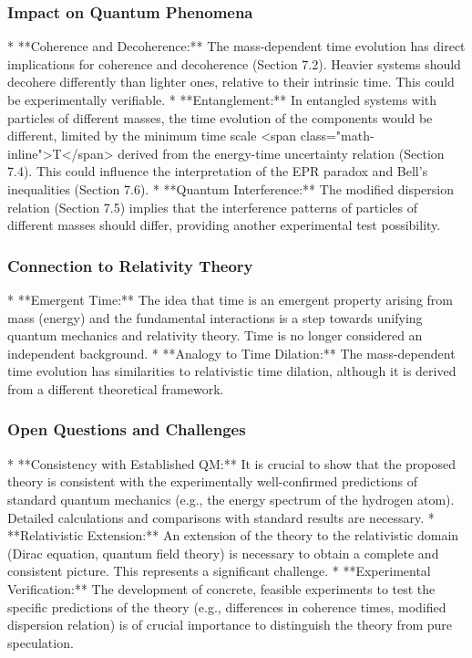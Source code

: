 \documentclass{article}
\begin{document}
\subsubsection{Impact on Quantum Phenomena}

*   **Coherence and Decoherence:** The mass-dependent time evolution has direct implications for coherence and decoherence (Section 7.2). Heavier systems should decohere differently than lighter ones, relative to their intrinsic time. This could be experimentally verifiable.
*   **Entanglement:** In entangled systems with particles of different masses, the time evolution of the components would be different, limited by the minimum time scale <span class="math-inline">T</span> derived from the energy-time uncertainty relation (Section 7.4). This could influence the interpretation of the EPR paradox and Bell's inequalities (Section 7.6).
*   **Quantum Interference:** The modified dispersion relation (Section 7.5) implies that the interference patterns of particles of different masses should differ, providing another experimental test possibility.

\subsubsection{Connection to Relativity Theory}

*   **Emergent Time:** The idea that time is an emergent property arising from mass (energy) and the fundamental interactions is a step towards unifying quantum mechanics and relativity theory. Time is no longer considered an independent background.
*   **Analogy to Time Dilation:** The mass-dependent time evolution has similarities to relativistic time dilation, although it is derived from a different theoretical framework.

\subsubsection{Open Questions and Challenges}

*   **Consistency with Established QM:** It is crucial to show that the proposed theory is consistent with the experimentally well-confirmed predictions of standard quantum mechanics (e.g., the energy spectrum of the hydrogen atom). Detailed calculations and comparisons with standard results are necessary.
*   **Relativistic Extension:** An extension of the theory to the relativistic domain (Dirac equation, quantum field theory) is necessary to obtain a complete and consistent picture. This represents a significant challenge.
*   **Experimental Verification:** The development of concrete, feasible experiments to test the specific predictions of the theory (e.g., differences in coherence times, modified dispersion relation) is of crucial importance to distinguish the theory from pure speculation.
\end{document}
